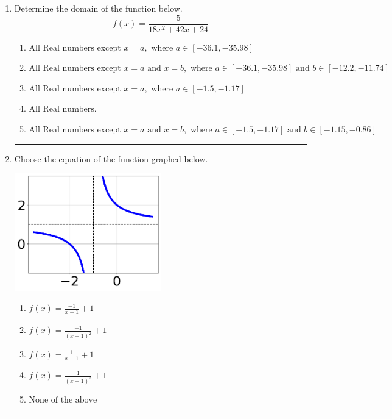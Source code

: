 \documentclass[14pt]{extbook}
\newcommand{\litem}[1]{\item#1\hspace*{-1cm}\rule{\textwidth}{0.4pt}}
\begin{document}
\begin{enumerate}
{\begin{enumerate}[label=\Alph*.]
\end{enumerate} }
\litem{
Determine the domain of the function below.\[ f(x) = \frac{5}{18x^{2} +42 x + 24} \]\begin{enumerate}[label=\Alph*.]
\item \( \text{All Real numbers except } x = a, \text{ where } a \in [-36.1, -35.98] \)
\item \( \text{All Real numbers except } x = a \text{ and } x = b, \text{ where } a \in [-36.1, -35.98] \text{ and } b \in [-12.2, -11.74] \)
\item \( \text{All Real numbers except } x = a, \text{ where } a \in [-1.5, -1.17] \)
\item \( \text{All Real numbers.} \)
\item \( \text{All Real numbers except } x = a \text{ and } x = b, \text{ where } a \in [-1.5, -1.17] \text{ and } b \in [-1.15, -0.86] \)

\end{enumerate} }
\litem{
Choose the equation of the function graphed below.
\begin{center}
    \includegraphics[width=0.5\textwidth]{../Figures/rationalGraphToEquationCopyC.png}
\end{center}
\begin{enumerate}[label=\Alph*.]
\item \( f(x) = \frac{-1}{x + 1} + 1 \)
\item \( f(x) = \frac{-1}{(x + 1)^2} + 1 \)
\item \( f(x) = \frac{1}{x - 1} + 1 \)
\item \( f(x) = \frac{1}{(x - 1)^2} + 1 \)
\item \( \text{None of the above} \)


\end{enumerate}}
\end{enumerate}
\end{document}
